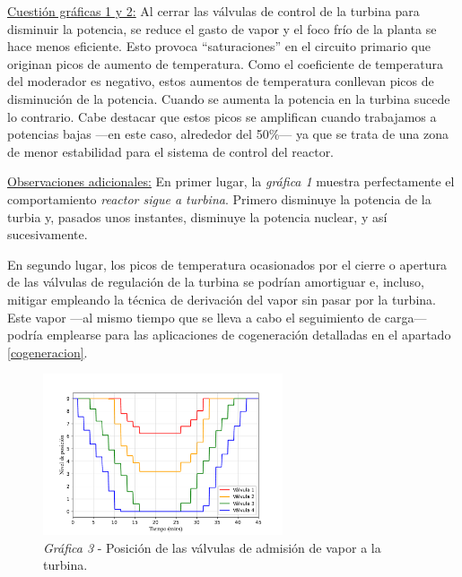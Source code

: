 \underline{Cuestión gráficas 1 y 2:} Al cerrar las válvulas de control de la turbina para disminuir la potencia, se reduce el gasto de vapor y el foco frío de la planta se hace menos eficiente. Esto provoca ``saturaciones'' en el circuito primario que originan picos de aumento de temperatura. Como el coeficiente de temperatura del moderador es negativo, estos aumentos de temperatura conllevan picos de disminución de la potencia. Cuando se aumenta la potencia en la turbina sucede lo contrario. Cabe destacar que estos picos se amplifican cuando trabajamos a potencias bajas ---en este caso, alrededor del 50\%--- ya que se trata de una zona de menor estabilidad para el sistema de control del reactor.

\underline{Observaciones adicionales:} En primer lugar, la \textit{gráfica 1} muestra perfectamente el comportamiento \textit{reactor sigue a turbina}. Primero disminuye la potencia de la turbia y, pasados unos instantes, disminuye la potencia nuclear, y así sucesivamente.

En segundo lugar, los picos de temperatura ocasionados por el cierre o apertura de las válvulas de regulación de la turbina se podrían amortiguar e, incluso, mitigar empleando la técnica de derivación del vapor sin pasar por la turbina. Este vapor ---al mismo tiempo que se lleva a cabo el seguimiento de carga--- podría emplearse para las aplicaciones de cogeneración detalladas en el apartado \ref{cogeneracion}.

\begin{figure}[!h]
  \centering
  \includegraphics[width=0.63\textwidth]{content/figures/sim1_valvulas_control.pdf}
  \caption{\textit{Gráfica 3} - Posición de las válvulas de admisión de vapor a la turbina.}
  \label{fig:sim1_valvulas_control}
\end{figure}

